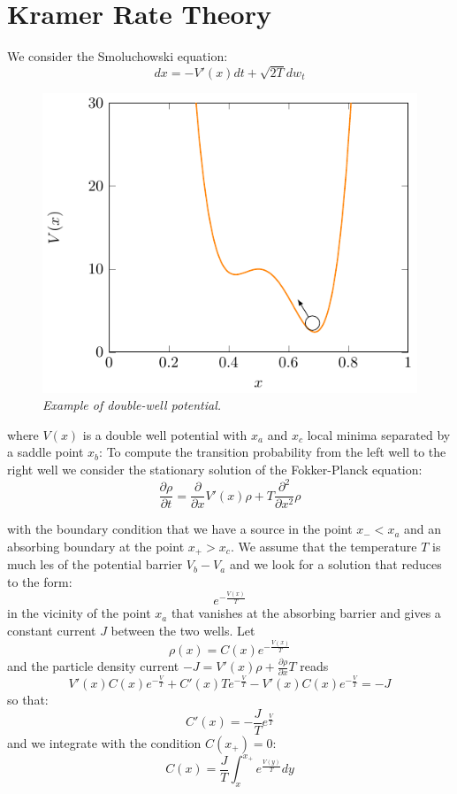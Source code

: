 \section{Kramer Rate Theory}
We consider the Smoluchowski equation:
\begin{equation}
dx = -V'(x)dt + \sqrt{2T} dw_t
\end{equation}

\begin{figure}
\centering
\includegraphics[scale=1.2]{images/kramerwell.pdf}
\caption{\emph{Example of double-well potential.}}
\label{fig:kr}
\end{figure}


where $V(x)$ is a double well potential with $x_a$ and $x_c$ local minima separated by a saddle point $x_b$: To compute the transition probability from the left well to the right well we consider the stationary solution of the Fokker-Planck equation:
\begin{equation}
\frac{\partial \rho}{\partial t } = \frac{\partial}{\partial x} V'(x)\rho + T \frac{\partial ^2 }{\partial x^2} \rho
\end{equation}

with the boundary condition that we have a source in the point $x_{-} < x_a$ and an absorbing boundary at the point $x_{+} > x_c$. We assume that the temperature $T$ is much les of the potential barrier $V_b - V_a$ and we look for a solution that reduces to the form:
$$
e^{-\frac{V(x)}{T}}
$$
in the vicinity of the point $x_a$ that vanishes at the absorbing barrier and gives a constant current $J$ between the two wells. Let
\begin{equation}
\rho(x)=C(x)e^{-\frac{V(x)}{T}}
\end{equation}
and the particle density current $-J=V'(x)\rho + \frac{\partial \rho}{\partial x}T$ reads
$$
V'(x)C(x)e^{-\frac{V}{T}} + C'(x)Te^{-\frac{V}{T}} - V'(x)C(x)e^{-\frac{V}{T}} = -J
$$
so that: 
$$
C'(x) = -\frac{J}{T}e^{\frac{V}{T}}
$$
and we integrate with the condition $C(x_{+}) = 0$:
$$
C(x) = \frac{J}{T}\int_{x}^{x_{+}} e^{\frac{V(y)}{T}}dy
$$

